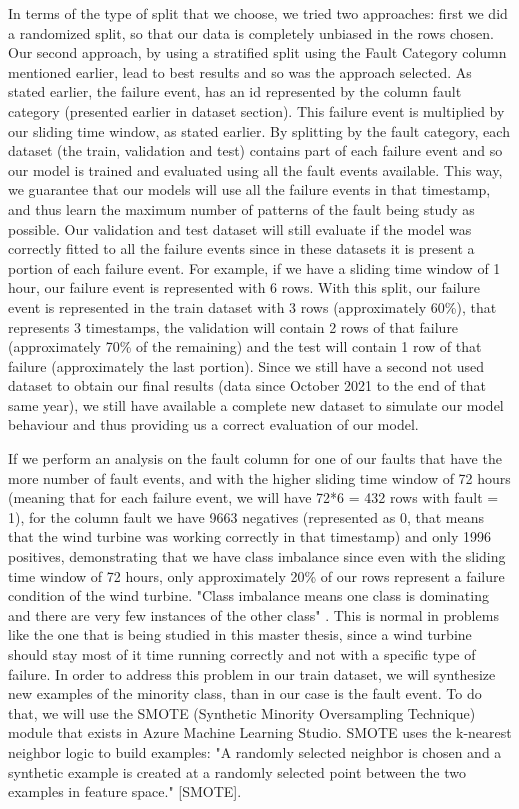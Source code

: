 In terms of the type of split that we choose, we tried two approaches: first we did a randomized split, so that our data is completely unbiased in the rows chosen. Our second approach, by using a stratified split using the Fault Category column mentioned earlier, lead to best results and so was the approach selected.
As stated earlier, the failure event, has an id represented by the column fault category (presented earlier in dataset section). This failure event is multiplied by our sliding time window, as stated earlier. By splitting by the fault category, each dataset (the train, validation and test) contains part of each failure event and so our model is trained and evaluated using all the fault events available. This way, we guarantee that our models will use all the failure events in that timestamp, and thus learn the maximum number of patterns of the fault being study as possible. Our validation and test dataset will still evaluate if the model was correctly fitted to all the failure events since in these datasets it is present a portion of each failure event.
For example, if we have a sliding time window of 1 hour, our failure event is represented with 6 rows. With this split, our failure event is represented in the train dataset with 3 rows (approximately 60\%), that represents 3 timestamps, the validation will contain 2 rows of that failure (approximately 70\% of the remaining) and the test will contain 1 row of that failure (approximately the last portion).
Since we still have a second not used dataset to obtain our final results (data since October 2021 to the end of that same year), we still have available a complete new dataset to simulate our model behaviour and thus providing us a correct evaluation of our model.


If we perform an analysis on the fault column for one of our faults that have the more number of fault events, and with the higher sliding time window of 72 hours (meaning that for each failure event, we will have 72*6 = 432 rows with fault = 1), for the column fault we have 9663 negatives (represented as 0, that means that the wind turbine was working correctly in that timestamp) and only 1996 positives, demonstrating that we have class imbalance since even with the sliding time window of 72 hours, only approximately 20\% of our rows represent a failure condition of the wind turbine.
"Class imbalance means one class is dominating and there are very few instances of the other class" \cite{ML_Data_processing}. This is normal in problems like the one that is being studied in this master thesis, since a wind turbine should stay most of it time running correctly and not with a specific type of failure.
In order to address this problem in our train dataset, we will synthesize new examples of the minority class, than in our case is the fault event. To do that, we will use the SMOTE (Synthetic Minority Oversampling Technique) module that exists in Azure Machine Learning Studio. SMOTE uses the k-nearest neighbor logic to build examples: "A randomly selected neighbor is chosen and a synthetic example is created at a randomly selected point between the two examples in feature space." [SMOTE].

